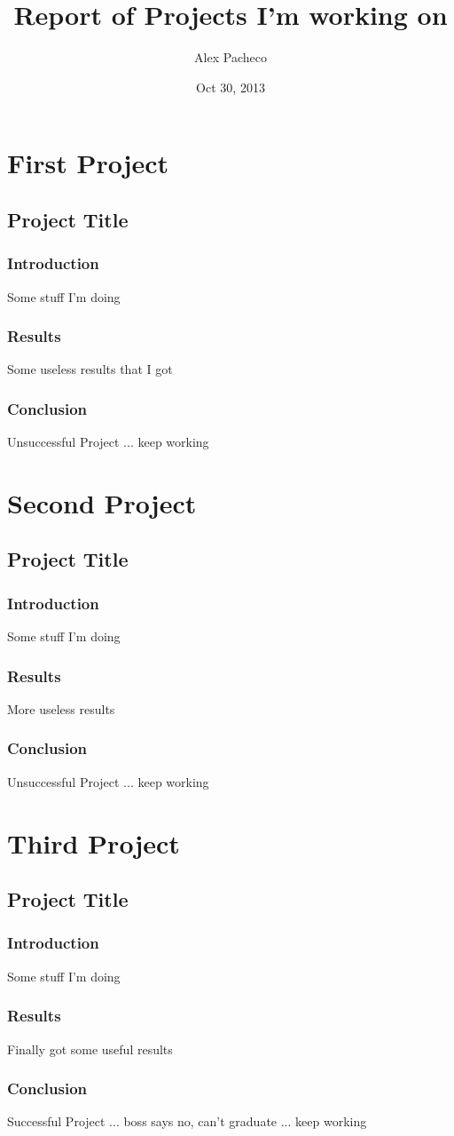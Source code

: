 \documentclass{report}
\title{Report of Projects I'm working on}
\author{Alex Pacheco}
\date{Oct 30, 2013}
\begin{document}
\maketitle
\part{First Project}
\chapter{Project Title}
\section{Introduction}
Some stuff I'm doing
\section{Results}
Some useless results that I got
\section{Conclusion}
Unsuccessful Project ... keep working
\part{Second Project}
\chapter{Project Title}
\section{Introduction}
Some stuff I'm doing
\section{Results}
More useless results
\section{Conclusion}
Unsuccessful Project ... keep working
\part{Third Project}
\chapter{Project Title}
\section{Introduction}
Some stuff I'm doing
\section{Results}
Finally got some useful results
\section{Conclusion}
Successful Project ... boss says no, can't graduate ... keep working
\end{document}
